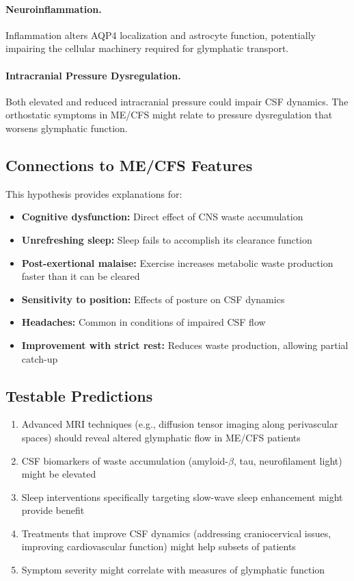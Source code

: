 \paragraph{Neuroinflammation.} Inflammation alters AQP4 localization and astrocyte function, potentially impairing the cellular machinery required for glymphatic transport.

\paragraph{Intracranial Pressure Dysregulation.} Both elevated and reduced intracranial pressure could impair CSF dynamics. The orthostatic symptoms in ME/CFS might relate to pressure dysregulation that worsens glymphatic function.

\subsection{Connections to ME/CFS Features}

This hypothesis provides explanations for:

\begin{itemize}
    \item \textbf{Cognitive dysfunction:} Direct effect of CNS waste accumulation
    \item \textbf{Unrefreshing sleep:} Sleep fails to accomplish its clearance function
    \item \textbf{Post-exertional malaise:} Exercise increases metabolic waste production faster than it can be cleared
    \item \textbf{Sensitivity to position:} Effects of posture on CSF dynamics
    \item \textbf{Headaches:} Common in conditions of impaired CSF flow
    \item \textbf{Improvement with strict rest:} Reduces waste production, allowing partial catch-up
\end{itemize}

\subsection{Testable Predictions}

\begin{enumerate}
    \item Advanced MRI techniques (e.g., diffusion tensor imaging along perivascular spaces) should reveal altered glymphatic flow in ME/CFS patients
    \item CSF biomarkers of waste accumulation (amyloid-$\beta$, tau, neurofilament light) might be elevated
    \item Sleep interventions specifically targeting slow-wave sleep enhancement might provide benefit
    \item Treatments that improve CSF dynamics (addressing craniocervical issues, improving cardiovascular function) might help subsets of patients
    \item Symptom severity might correlate with measures of glymphatic function
\end{enumerate}


